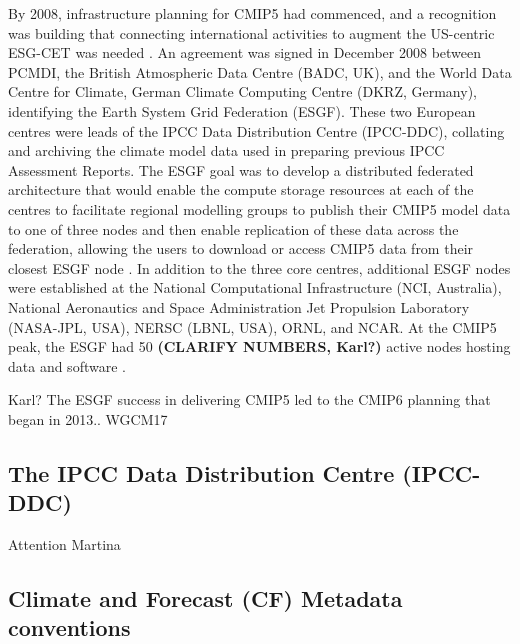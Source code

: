 \documentclass[gmd, preprint]{copernicus}
\newcommand{\mycomment}[1]{}
\def\cred#1{{\color{red}#1}}
\begin{document}
By 2008, infrastructure planning for CMIP5 had commenced, and a recognition was building that connecting international activities to augment the US-centric ESG-CET was needed \citep{williams_global_2016}. An agreement was signed in December 2008 between PCMDI, the British Atmospheric Data Centre (BADC, UK), and the World Data Centre for Climate, German Climate Computing Centre (DKRZ, Germany), identifying the Earth System Grid Federation (ESGF). These two European centres were leads of the IPCC Data Distribution Centre (IPCC-DDC), collating and archiving the climate model data used in preparing previous IPCC Assessment Reports. The ESGF goal was to develop a distributed federated architecture that would enable the compute storage resources at each of the centres to facilitate regional modelling groups to publish their CMIP5 model data to one of three nodes and then enable replication of these data across the federation, allowing the users to download or access CMIP5 data from their closest ESGF node \citep{williams_earth_2011}. In addition to the three core centres, additional ESGF nodes were established at the National Computational Infrastructure (NCI, Australia), National Aeronautics and Space Administration Jet Propulsion Laboratory (NASA-JPL, USA), NERSC (LBNL, USA), ORNL, and NCAR. At the CMIP5 peak, the ESGF had 50 \cred{\textbf{(CLARIFY NUMBERS, Karl?)}} active nodes hosting data and software \citep{williams_global_2016}.
\mycomment{
CMIP6 current nodes - https://aims2.llnl.gov/nodes
Very early CMIP5 http://web.archive.org/web/20111015000202/http://pcmdi3.llnl.gov/esgcet/home.htm 7 nodes ESG-CET + BADC, WDCC, NCI
ESG-CET NCAR, LLNL, ORNL https://extranet.gfdl.noaa.gov/~vb/curator/AR5-20071017/ESG-CET200710.pdf Oct 2007
2013 Aspen workshop - https://www.wcrp-climate.org/images/modelling/WGCM/WGCM17/WGCM17_report.pdf;
Middleton, Foster and Williams et al., 2006: Earth System Grid II final report 2001-2006 SCIDAC https://www.osti.gov/servlets/purl/1113798 https://doi.org/10.2172/1113798
}
\cred{Karl? The ESGF success in delivering CMIP5 led to the CMIP6 planning that began in 2013.. WGCM17}


\subsection{The IPCC Data Distribution Centre (IPCC-DDC)}
\label{sec:IPCC-DDC}
\cred{Attention Martina}


\subsection{Climate and Forecast (CF) Metadata conventions}
\label{sec:CFConventions}
\end{document}
